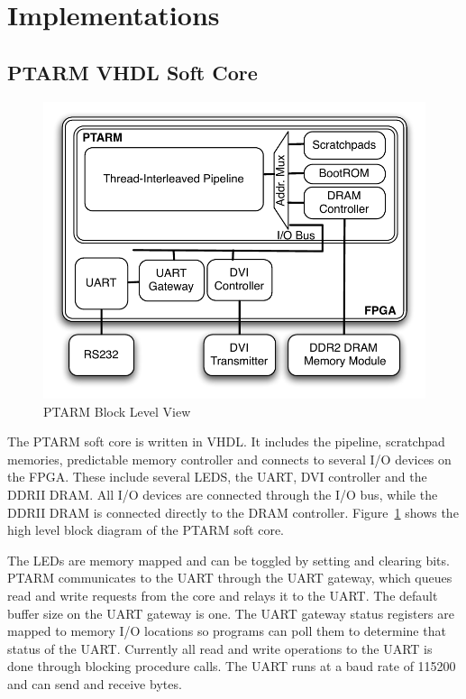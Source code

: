 \section{Implementations}
\subsection{PTARM VHDL Soft Core}
\label{sec:ptarm_vhdl_soft_core}
\begin{figure}
  \vspace{-20pt}
  \begin{center}
    \includegraphics[scale=.6]{figs/ptarm_vhdl_high_level}
  \end{center}
  \vspace{-3mm}
  \caption{PTARM Block Level View}
  \label{fig:ptarm_vhdl_high_level}
  \vspace{-10pt}
\end{figure}   
The PTARM soft core is written in VHDL.
It includes the pipeline, scratchpad memories, predictable memory controller and connects to several I/O devices on the FPGA.
These include several LEDS, the UART, DVI controller and the DDRII DRAM.
All I/O devices are connected through the I/O bus, while the DDRII DRAM is connected directly to the DRAM controller.
Figure~\ref{fig:ptarm_vhdl_high_level} shows the high level block diagram of the PTARM soft core.

The LEDs are memory mapped and can be toggled by setting and clearing bits.
PTARM communicates to the UART through the UART gateway, which queues read and write requests from the core and relays it to the UART.
The default buffer size on the UART gateway is one.
The UART gateway status registers are mapped to memory I/O locations so programs can poll them to determine that status of the UART.  
Currently all read and write operations to the UART is done through blocking procedure calls. 
The UART runs at a baud rate of 115200 and can send and receive bytes.

